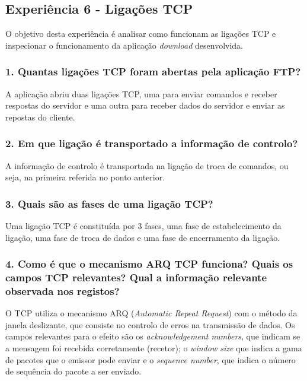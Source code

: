 \subsection*{Experiência 6 - Ligações TCP}
O objetivo desta experiência é analisar como funcionam as ligações TCP e inspecionar o funcionamento da aplicação \emph{download} desenvolvida.

\subsubsection{1. Quantas ligações TCP foram abertas pela aplicação FTP?}
A aplicação abriu duas ligações TCP, uma para enviar comandos e receber respostas do servidor e 
uma outra para receber dados do servidor e enviar as repostas do cliente.

\subsubsection{2. Em que ligação é transportado a informação de controlo?}
A informação de controlo é transportada na ligação de troca de comandos, ou seja, na primeira referida no ponto anterior.

\subsubsection{3. Quais são as fases de uma ligação TCP?}
Uma ligação TCP é constituída por 3 fases, uma fase de estabelecimento da ligação, uma fase de troca de dados e uma fase de encerramento da ligação.

\subsubsection{4. Como é que o mecanismo ARQ TCP funciona? Quais os campos TCP relevantes? Qual a informação relevante observada nos registos?}
O TCP utiliza o mecanismo ARQ (\emph{Automatic Repeat Request}) com o método da janela deslizante, que consiste no controlo de erros na transmissão de dados. 
Os campos relevantes para o efeito são os \emph{acknowledgement numbers}, que indicam se a mensagem foi recebida corretamente (recetor); o \emph{window size} que indica a gama de pacotes que o emissor pode enviar e o \emph{sequence number}, que indica o número de sequência do pacote a ser enviado.

